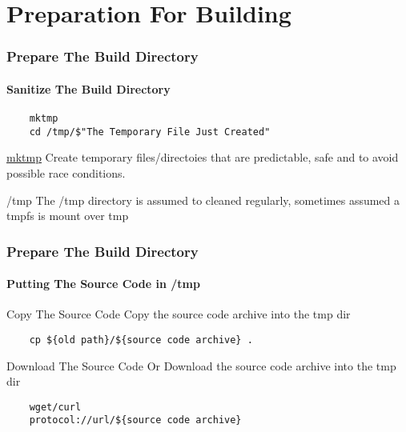 \documentclass[12pt,hyperref={pdfpagelabels=true}]{beamer}
\begin{document}
\section{Preparation For Building}

\begin{frame}[fragile]
  \frametitle{Prepare The Build Directory}
  \framesubtitle{Sanitize The Build Directory}
  \lstset{language=sh}
  \begin{lstlisting}
    mktmp
    cd /tmp/$"The Temporary File Just Created"
  \end{lstlisting}

  \pause

  \begin{alertblock}{\href{http://unixhelp.ed.ac.uk/CGI/man-cgi?mktemp}{mktmp}}
    Create temporary files/directoies that are predictable, safe and to avoid
    possible race conditions.
  \end{alertblock}

  \pause

  \begin{alertblock}{/tmp}
    The /tmp directory is assumed to cleaned regularly, sometimes assumed a
    tmpfs is mount over tmp
  \end{alertblock}
\end{frame}

\begin{frame}[fragile]
  \frametitle{Prepare The Build Directory}
  \framesubtitle{Putting The Source Code in /tmp}
  \lstset{language=sh}
  \begin{block}{Copy The Source Code}
    Copy the source code archive into the tmp dir
  \end{block}

  \pause

  \begin{lstlisting}
    cp ${old path}/${source code archive} .
  \end{lstlisting}

  \pause

  \begin{block}{Download The Source Code}
    Or Download the source code archive into the tmp dir
  \end{block}

  \pause

  \begin{lstlisting}
    wget/curl
    protocol://url/${source code archive}
  \end{lstlisting}
\end{frame}
\end{document}
